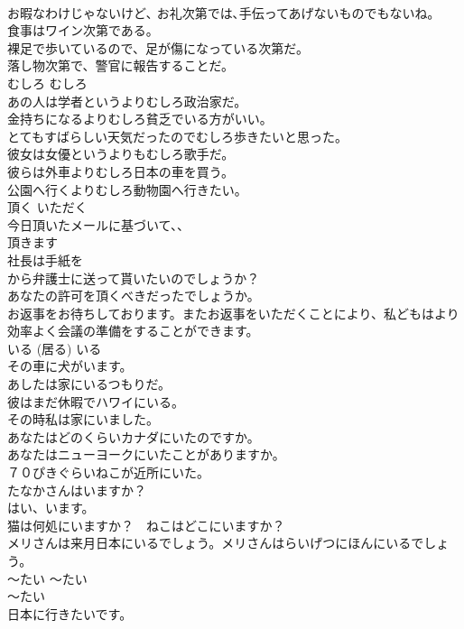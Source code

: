 \documentclass[8pt]{extreport}
\begin{document}
\begin{CJK}{UTF8}{min}
\\	お暇なわけじゃないけど､ お礼次第では､手伝ってあげないものでもないね｡  
\\	食事はワイン次第である。  
\\	裸足で歩いているので、足が傷になっている次第だ。  
\\	落し物次第で、警官に報告することだ。  
\\	むしろ	むしろ	
\\	あの人は学者というよりむしろ政治家だ。  
\\	金持ちになるよりむしろ貧乏でいる方がいい。  
\\	とてもすばらしい天気だったのでむしろ歩きたいと思った。  
\\	彼女は女優というよりもむしろ歌手だ。   
\\	彼らは外車よりむしろ日本の車を買う。   
\\	公園へ行くよりむしろ動物園へ行きたい。   
\\	頂く	いただく	
\\	今日頂いたメールに基づいて、、  
\\	頂きます  
\\	社長は手紙を
\\	から弁護士に送って貰いたいのでしょうか？  
\\	あなたの許可を頂くべきだったでしょうか。  
\\	お返事をお待ちしております。またお返事をいただくことにより、私どもはより効率よく会議の準備をすることができます。  
\\	いる (居る)	いる	
\\	その車に犬がいます。
\\	あしたは家にいるつもりだ。  
\\	彼はまだ休暇でハワイにいる。  
\\	その時私は家にいました。  
\\	あなたはどのくらいカナダにいたのですか。  
\\	あなたはニューヨークにいたことがありますか。  
\\	７０ぴきぐらいねこが近所にいた。  
\\	たなかさんはいますか？　   
\\	はい、います。   
\\	猫は何処にいますか？　ねこはどこにいますか？   
\\	メリさんは来月日本にいるでしょう。メリさんはらいげつにほんにいるでしょう。　   
\\	〜たい	〜たい	
\\	〜たい	
\\	日本に行きたいです。  

\end{CJK}
\end{document}
